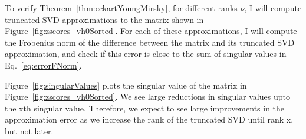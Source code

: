 \documentclass[12pt]{article}
\begin{document}
\begin{appendices}
To verify Theorem~\ref{thm:eckartYoungMirsky}, for different ranks $\nu$, I
will compute truncated SVD approximations to the matrix shown in
Figure~\ref{fig:zscores_vh0Sorted}.
For each of these approximations, I will compute the Frobenius norm of the
difference between the matrix and its truncated SVD approximation, and check
if this error is close to the sum of singular values in Eq.~\ref{eq:errorFNorm}.

Figure~\ref{fig:singularValues} plots the singular value of the matrix in
Figure~\ref{fig:zscores_vh0Sorted}. We see large reductions in singular values
upto the xth singular value. Therefore, we expect to see large improvements in
the approximation error as we increase the rank of the truncated SVD until rank
x, but not later.

\end{appendices}

\end{document}
